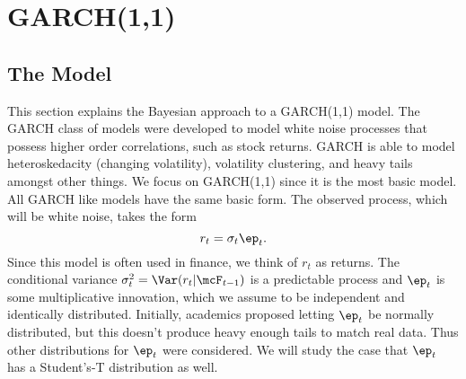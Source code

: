 \documentclass{article}
\begin{document}
\large %
\linespread{1.1} %

\setcounter{section}{0}

\tableofcontents

\newpage

\section{GARCH(1,1)}

\subsection{The Model}

This section explains the Bayesian approach to a GARCH(1,1) model.  The GARCH class of models were developed to model white noise processes that possess higher order correlations, such as stock returns.  GARCH is able to model heteroskedacity (changing volatility), volatility clustering, and heavy tails amongst other things.  We focus on GARCH(1,1) since it is the most basic model.  All GARCH like models have the same basic form.  The observed process, which will be white noise, takes the form
\[
r_t = \sigma_t \ep_t.
\]
Since this model is often used in finance, we think of $r_t$ as returns.  The conditional variance $\sigma_t^2 = \Var (r_t | \mcF_{t-1})$ is a predictable process and $\ep_t$ is some multiplicative innovation, which we assume to be independent and identically distributed.  Initially, academics proposed letting $\ep_t$ be normally distributed, but this doesn't produce heavy enough tails to match real data.  Thus other distributions for $\ep_t$ were considered.  We will study the case that $\ep_t$ has a Student's-T distribution as well.
\end{document}

